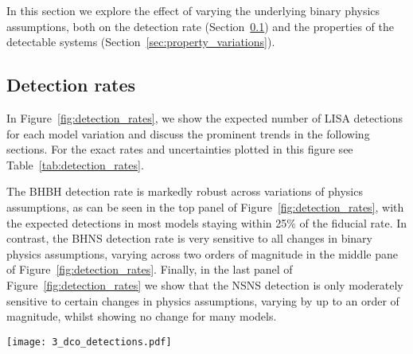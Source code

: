 In this section we explore the effect of varying the underlying binary physics assumptions, both on the detection rate (Section~\ref{sec:detection_rate_analysis}) and the properties of the detectable systems (Section~\ref{sec:property_variations}).

\subsection{Detection rates}\label{sec:detection_rate_analysis}
In Figure~\ref{fig:detection_rates}, we show the expected number of LISA detections for each model variation and discuss the prominent trends in the following sections. For the exact rates and uncertainties plotted in this figure see Table~\ref{tab:detection_rates}.

The BHBH detection rate is markedly robust across variations of physics assumptions, as can be seen in the top panel of Figure~\ref{fig:detection_rates}, with the expected detections in most models staying within 25\% of the fiducial rate. In contrast, the BHNS detection rate is very sensitive to all changes in binary physics assumptions, varying across two orders of magnitude in the middle pane of Figure~\ref{fig:detection_rates}. Finally, in the last panel of Figure~\ref{fig:detection_rates} we show that the NSNS detection is only moderately sensitive to certain changes in physics assumptions, varying by up to an order of magnitude, whilst showing no change for many models.

\begin{figure*}[p]
    \centering
    \texttt{[image: 3\_dco\_detections.pdf]}
    \caption{The number of expected detections in the LISA mission for different DCO types and model variations. Error bars show the 1- (solid) and 2-$\sigma$ (dotted) Poisson uncertainties. An arrow indicates that the error bar extends to zero. The left axis and grid lines show the number of detections in a 4-year LISA mission and the right axis shows an approximation of the number of detections in a 10-year mission (we scale the axis by $\sqrt{T_{\rm obs}}$, see Table~\ref{tab:detection_rates} for exact rates). Each model is described in further detail in Table~\ref{tab:physics_variations} and details of the fiducial assumptions are in Section~\ref{sec:fiducial_physics}. See Sec.~\ref{sec:detection_rate_analysis} for a discussion. }
    \label{fig:detection_rates}
\end{figure*}

